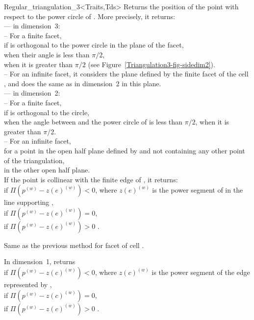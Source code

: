 \begin{ccClassTemplate}{Regular_triangulation_3<Traits,Tds>}
{Returns the position of the point  with respect to the
power circle of . More precisely, it returns:\\
--- in dimension~3:\\
-- For a finite facet,\\
 if  is orthogonal to the power circle in the
plane of the facet,\\ 
 when their angle is less than $\pi/2$,\\
 when it is greater than $\pi/2$ (see
Figure~\ref{Triangulation3-fig-sidedim2}).\\ 
-- For an infinite facet, it considers the plane defined by the finite
facet of the cell , and does the same as in
dimension~2 in this plane.\\
--- in dimension~2:\\
-- For a finite facet,\\
 if  is orthogonal to the circle,\\
 when the angle between  and the
power circle of  is less than $\pi/2$,
 when it is greater than $\pi/2$.\\ 
-- For an infinite facet,\\
 for a point in the open half plane defined by
 and not containing any other point of the triangulation,\\
 in the other open half plane.\\
If the point  is collinear with the finite edge  of
, it returns:\\
 if $\Pi({p}^{(w)}-{z(e)}^{(w)})<0$, where
${z(e)}^{(w)}$ is the power segment of  in the line supporting
,\\ 
 if $\Pi({p}^{(w)}-{z(e)}^{(w)})=0$,\\
 if $\Pi({p}^{(w)}-{z(e)}^{(w)})>0$ .
}

{Same as the previous method for facet  of cell .}

{In dimension~1, returns\\
 if $\Pi({p}^{(w)}-{z(c)}^{(w)})<0$, where
${z(c)}^{(w)}$ is the power segment of the edge represented by
,\\
 if $\Pi({p}^{(w)}-{z(c)}^{(w)})=0$,\\
 if $\Pi({p}^{(w)}-{z(c)}^{(w)})>0$ .
}


\end{ccClassTemplate}
